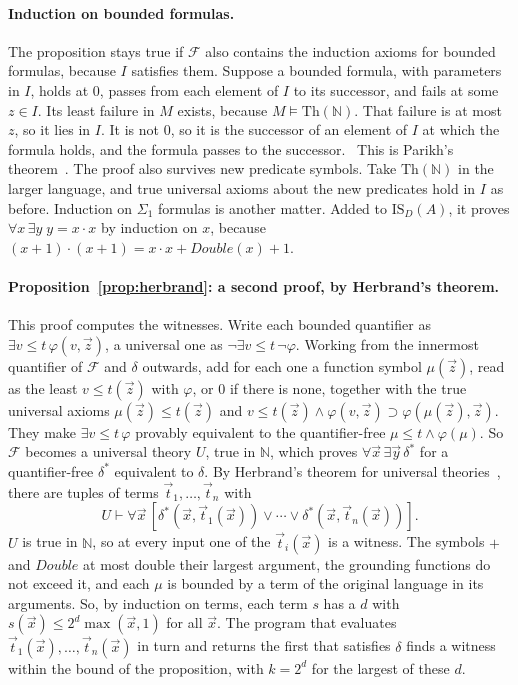 \documentclass[11pt]{article}
\newcommand{\F}{\mathcal{F}}
\newcommand{\contra}{~\text{\Lightning}}  %
\newcommand{\ISD}{\mathrm{IS}_D(A)}
\theoremstyle{plain}
\theoremstyle{definition}
\begin{document}
\paragraph{Induction on bounded formulas.} The proposition stays true if
$\F$ also contains the induction axioms for bounded formulas, because $I$
satisfies them. Suppose a bounded formula, with parameters in $I$, holds at
$0$, passes from each element of $I$ to its successor, and fails at some
$z \in I$. Its least failure in $M$ exists, because $M \models
\mathrm{Th}(\mathbb N)$. That failure is at most $z$, so it lies in $I$. It
is not $0$, so it is the successor of an element of $I$ at which the formula
holds, and the formula passes to the successor.\contra{} This is Parikh's
theorem~\cite{parikh71}. The proof also survives new predicate symbols. Take
$\mathrm{Th}(\mathbb N)$ in the larger language, and true universal axioms
about the new predicates hold in $I$ as before. Induction on $\Sigma_1$ formulas is another
matter. Added to $\ISD$, it proves $\forall x\,\exists y\; y = x \cdot x$ by
induction on $x$, because $(x+1)\cdot(x+1) = x \cdot x +
\mathit{Double}(x) + 1$.

\paragraph{Proposition~\ref{prop:herbrand}: a second proof, by Herbrand's
theorem.} This proof computes the witnesses. Write each bounded quantifier
as $\exists v \le t\,\varphi(v, \vec z)$, a universal one as
$\neg\exists v \le t\,\neg\varphi$. Working from the innermost quantifier
of $\F$ and $\delta$ outwards, add for each one a function symbol
$\mu(\vec z)$, read as the least $v \le t(\vec z)$ with $\varphi$, or $0$ if
there is none, together with the true universal axioms
$\mu(\vec z) \le t(\vec z)$ and $v \le t(\vec z) \wedge \varphi(v, \vec z)
\supset \varphi(\mu(\vec z), \vec z)$. They make $\exists v \le t\,\varphi$
provably equivalent to the quantifier-free
$\mu \le t \wedge \varphi(\mu)$. So $\F$ becomes a universal theory $U$,
true in $\mathbb N$, which proves $\forall\vec x\,\exists\vec y\,\delta^*$
for a quantifier-free $\delta^*$ equivalent to $\delta$. By Herbrand's
theorem for universal theories~\cite{buss98}, there are tuples of terms
$\vec t_1, \ldots, \vec t_n$ with
\[
U \vdash \forall\vec x\,[\delta^*(\vec x, \vec t_1(\vec x)) \vee \cdots \vee
\delta^*(\vec x, \vec t_n(\vec x))].
\]
$U$ is true in $\mathbb N$, so at every input one of the
$\vec t_i(\vec x)$ is a witness. The symbols $+$ and $\mathit{Double}$ at
most double their largest argument, the grounding functions do not exceed
it, and each $\mu$ is bounded by a term of the original language in its
arguments. So, by induction on terms, each term $s$ has a $d$ with
$s(\vec x) \le 2^d \max(\vec x, 1)$ for all $\vec x$. The program that
evaluates $\vec t_1(\vec x), \ldots, \vec t_n(\vec x)$ in turn and returns
the first that satisfies $\delta$ finds a witness within the bound of the
proposition, with $k = 2^d$ for the largest of these $d$.
\end{document}
